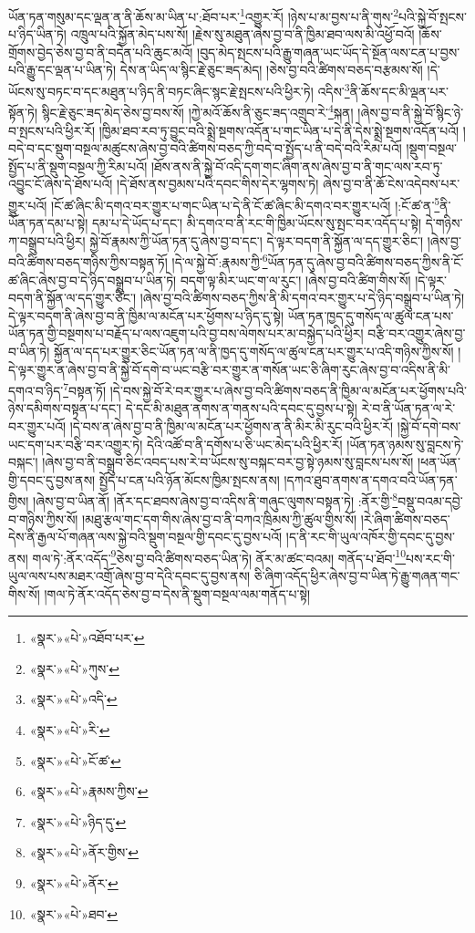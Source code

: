 ཡོན་ཏན་གསུམ་དང་ལྡན་ན་ནི་ཆོས་མ་ཡིན་པ་:ཐོབ་པར་\footnote{«སྣར་»«པེ་»འཐོབ་པར་}འགྱུར་རོ། །ཉེས་པ་མ་བྱས་པ་ནི་གུས་\footnote{«སྣར་»«པེ་»ཀུས་}པའི་སྐྱེ་བོ་སྤངས་པ་ཉིད་ཡིན་ཏེ། འཁྲུལ་པའི་སྐྱོན་མེད་པས་སོ། །རྗེས་སུ་མཐུན་ཞེས་བྱ་བ་ནི་ཁྱིམ་ཐབ་ལས་མི་འཕྱོ་བའོ། །ཆོས་གྲོགས་བྱེད་ཅེས་བྱ་བ་ནི་བདེན་པའི་ཆུང་མའོ། །བུད་མེད་སྤངས་པའི་རྒྱུ་གཞན་ཡང་ཡོད་དེ་སྔོན་ལས་ངན་པ་བྱས་པའི་རྒྱུ་དང་ལྡན་པ་ཡིན་ཏེ། དེས་ན་ཡིད་ལ་སྙིང་རྗེ་ཅུང་ཟད་མེད། །ཅེས་བྱ་བའི་ཚིགས་བཅད་བརྩམས་སོ། །དེ་ཡོངས་སུ་བཏང་བ་དང་མཐུན་པ་ཉིད་ནི་བཏང་ཞིང་སྙང་རྗེ་སྤངས་པའི་ཕྱིར་ཏེ། འདིས་\footnote{«སྣར་»«པེ་»འདི་}ནི་ཆོས་དང་མི་ལྡན་པར་སྟོན་ཏེ། སྙིང་རྗེ་ཅུང་ཟད་མེད་ཅེས་བྱ་བས་སོ། །ཀྱེ་མའོ་ཆོས་ནི་ཅུང་ཟད་འགྲུབ་རེ་\footnote{«སྣར་»«པེ་»རི་}སྐན། །ཞེས་བྱ་བ་ནི་སྐྱེ་བོ་སྙིང་ཉེ་བ་སྤངས་པའི་ཕྱིར་རོ། །ཁྱིམ་ཐབ་རབ་ཏུ་བྱུང་བའི་སྨྲེ་སྔགས་འདོན་པ་གང་ཡིན་པ་དེ་ནི་དེས་སྨྲེ་སྔགས་འདོན་པའོ། །བདེ་བ་དང་སྡུག་བསྔལ་མཚུངས་ཞེས་བྱ་བའི་ཚིགས་བཅད་ཀྱི་བདེ་བ་སྤྱོད་པ་ནི་བདེ་བའི་རིམ་པའོ། །སྡུག་བསྔལ་སྤྱོད་པ་ནི་སྡུག་བསྔལ་ཀྱི་རིམ་པའོ། །ཐོས་ནས་ནི་སྐྱེ་བོ་འདི་དག་གང་ཞིག་ནས་ཞེས་བྱ་བ་ནི་གང་ལས་རབ་ཏུ་འབྱུང་ངོ་ཞེས་དེ་ཐོས་པའོ། །དེ་ཐོས་ནས་བྱམས་པའི་དབང་གིས་དེར་ལྷགས་ཏེ། ཞེས་བྱ་བ་ནི་ཆོ་ངེས་འདེབས་པར་གྱུར་པའོ། །ངོ་ཚ་ཞིང་མི་དགའ་བར་གྱུར་པ་གང་ཡིན་པ་དེ་ནི་ངོ་ཚ་ཞིང་མི་དགའ་བར་གྱུར་པའོ། །:ངོ་ཚ་ན་\footnote{«སྣར་»«པེ་»ངོ་ཚ་}ནི་ཡོན་ཏན་དམ་པ་སྟེ། དམ་པ་དེ་ཡོད་པ་དང་། མི་དགའ་བ་ནི་རང་གི་ཁྱིམ་ཡོངས་སུ་སྤང་བར་འདོད་པ་སྟེ། དེ་གཉིས་ཀ་བསྒྲུབ་པའི་ཕྱིར། སྐྱེ་བོ་རྣམས་ཀྱི་ཡོན་ཏན་དུ་ཞེས་བྱ་བ་དང་། དེ་ལྟར་བདག་ནི་སྐྱོན་ལ་དད་གྱུར་ཅིང་། །ཞེས་བྱ་བའི་ཚིགས་བཅད་གཉིས་ཀྱིས་བསྟན་ཏོ། །དེ་ལ་སྐྱེ་བོ་:རྣམས་ཀྱི་\footnote{«སྣར་»«པེ་»རྣམས་ཀྱིས་}ཡོན་ཏན་དུ་ཞེས་བྱ་བའི་ཚིགས་བཅད་ཀྱིས་ནི་ངོ་ཚ་ཞིང་ཞེས་བྱ་བ་དེ་ཉིད་བསྒྲུབ་པ་ཡིན་ཏེ། བདག་ལྟ་མིར་ཡང་ག་ལ་རུང་། །ཞེས་བྱ་བའི་ཚིག་གིས་སོ། །དེ་ལྟར་བདག་ནི་སྐྱོན་ལ་དད་གྱུར་ཅིང་། །ཞེས་བྱ་བའི་ཚིགས་བཅད་ཀྱིས་ནི་མི་དགའ་བར་གྱུར་པ་དེ་ཉིད་བསྒྲུབ་པ་ཡིན་ཏེ། དེ་ལྟར་བདག་ནི་ཞེས་བྱ་བ་ནི་ཁྱིམ་ལ་མངོན་པར་ཕྱོགས་པ་ཉིད་དུ་སྟེ། ཡོན་ཏན་ཁྱད་དུ་གསོད་ལ་ཚུལ་ངན་པས་ཡོན་ཏན་གྱི་བསྔགས་པ་བརྗོད་པ་ལས་འཇུག་པའི་བྱ་བས་ལེགས་པར་མ་བསྐྱེད་པའི་ཕྱིར། བརྩི་བར་འགྱུར་ཞེས་བྱ་བ་ཡིན་ཏེ། སྐྱོན་ལ་དད་པར་གྱུར་ཅིང་ཡོན་ཏན་ལ་ནི་ཁྱད་དུ་གསོད་ལ་ཚུལ་ངན་པར་གྱུར་པ་འདི་གཉིས་ཀྱིས་སོ། །དེ་ལྟར་གྱུར་ན་ཞེས་བྱ་བ་ནི་སྐྱེ་བོ་དགེ་བ་ཡང་བརྩི་བར་གྱུར་ན་གསོན་ཡང་ཅི་ཞིག་རུང་ཞེས་བྱ་བ་འདིས་ནི་མི་དགའ་བ་ཉིད་\footnote{«སྣར་»«པེ་»ཉིད་དུ་}བསྟན་ཏོ། །དེ་བས་སྐྱེ་བོ་རེ་བར་གྱུར་པ་ཞེས་བྱ་བའི་ཚིགས་བཅད་ནི་ཁྱིམ་ལ་མངོན་པར་ཕྱོགས་པའི་ཉེས་དམིགས་བསྟན་པ་དང་། དེ་དང་མི་མཐུན་ནགས་ན་གནས་པའི་དབང་དུ་བྱས་པ་སྟེ། རེ་བ་ནི་ཡོན་ཏན་ལ་རེ་བར་གྱུར་པའོ། །དེ་བས་ན་ཞེས་བྱ་བ་ནི་ཁྱིམ་ལ་མངོན་པར་ཕྱོགས་ན་ནི་མིར་མི་རུང་བའི་ཕྱིར་རོ། །སྐྱེ་བོ་དགེ་བས་ཡང་དག་པར་བརྩི་བར་འགྱུར་ཏེ། དེའི་འཚོ་བ་ནི་དགོས་པ་ཅི་ཡང་མེད་པའི་ཕྱིར་རོ། །ཡོན་ཏན་ཉམས་སུ་བླངས་ཏེ་བསྐང་། །ཞེས་བྱ་བ་ནི་བསྒྲུབ་ཅིང་འབད་པས་རེ་བ་ཡོངས་སུ་བསྐང་བར་བྱ་སྟེ་ཉམས་སུ་བླངས་པས་སོ། །ཕན་ཡོན་གྱི་དབང་དུ་བྱས་ནས། སྤྱོད་པ་ངན་པའི་ཉོན་མོངས་ཁྱིམ་སྤངས་ནས། །དཀའ་ཐུབ་ནགས་ན་དགའ་བའི་ཡོན་ཏན་གྱིས། །ཞེས་བྱ་བ་ཡིན་ནོ། །ནོར་དང་ཐབས་ཞེས་བྱ་བ་འདིས་ནི་གཞུང་ལུགས་བསྟན་ཏེ། :ནོར་གྱི་\footnote{«སྣར་»«པེ་»ནོར་གྱིས་}བསྡུ་བའམ་དབྱེ་བ་གཉིས་ཀྱིས་སོ། །མཐུ་རྩལ་གང་དག་གིས་ཞེས་བྱ་བ་ནི་བཀའ་ཁྲིམས་ཀྱི་ཚུལ་གྱིས་སོ། །རེ་ཞིག་ཚིགས་བཅད་དེས་ནི་རྒྱལ་པོ་གཞན་ལས་སྐྱེ་བའི་སྡུག་བསྔལ་གྱི་དབང་དུ་བྱས་པའོ། །ད་ནི་རང་གི་ཡུལ་འཁོར་གྱི་དབང་དུ་བྱས་ནས། གལ་ཏེ་:ནོར་འདོད་\footnote{«སྣར་»«པེ་»ནོར་}ཅེས་བྱ་བའི་ཚིགས་བཅད་ཡིན་ཏེ། ནོར་མ་ཚང་བའམ། གནོད་པ་ཐོབ་\footnote{«སྣར་»«པེ་»ཐབ་}པས་རང་གི་ཡུལ་ལས་པས་མཐར་འགྲོ་ཞེས་བྱ་བ་དེའི་དབང་དུ་བྱས་ནས། ཅི་ཞིག་འདོད་ཕྱིར་ཞེས་བྱ་བ་ཡིན་ཏེ་རྒྱུ་གཞན་གང་གིས་སོ། །གལ་ཏེ་ནོར་འདོད་ཅེས་བྱ་བ་དེས་ནི་སྡུག་བསྔལ་ལམ་གནོད་པ་སྟེ། 